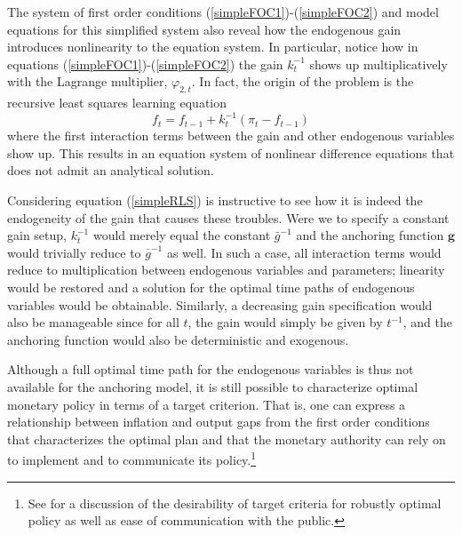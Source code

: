 \documentclass[11pt]{article}
\renewcommand{\[}{\begin{equation}}
\renewcommand{\]}{\end{equation}}
\begin{document}
The system of first order conditions (\ref{simpleFOC1})-(\ref{simpleFOC2}) and model equations for this simplified system also reveal how the endogenous gain introduces nonlinearity to the equation system. In particular, notice how in equations (\ref{simpleFOC1})-(\ref{simpleFOC2}) the gain $k_t^{-1}$ shows up multiplicatively with the Lagrange multiplier, $\varphi_{2,t}$. In fact, the origin of the problem is the recursive least squares learning equation
\begin{equation}
f_t = f_{t-1} + k_t^{-1}(\pi_t - f_{t-1}) \label{simpleRLS}
\end{equation}
where the first interaction terms between the gain and other endogenous variables show up. This results in an equation system of nonlinear difference equations that does not admit an analytical solution. 

Considering equation (\ref{simpleRLS}) is instructive to see how it is indeed the endogeneity of the gain that causes these troubles. Were we to specify a constant gain setup, $k_t^{-1}$ would merely equal the constant $\bar{g}^{-1}$ and the anchoring function $\mathbf{g}$ would trivially reduce to $\bar{g}^{-1}$ as well. In such a case, all interaction terms would reduce to multiplication between endogenous variables and parameters; linearity would be restored and a solution for the optimal time paths of endogenous variables would be obtainable. Similarly, a decreasing gain specification would also be manageable since for all $t$, the gain would simply be given by $t^{-1}$, and the anchoring function would also be deterministic and exogenous. 

Although a full optimal time path for the endogenous variables is thus not available for the anchoring model, it is still possible to characterize optimal monetary policy in terms of a target criterion. That is, one can express a relationship between inflation and output gaps from the first order conditions that characterizes the optimal plan and that the monetary authority can rely on to implement and to communicate its policy.\footnote{See \cite{woodford2011interest} for a discussion of the desirability of target criteria for robustly optimal policy as well as ease of communication with the public.}  
\end{document}
